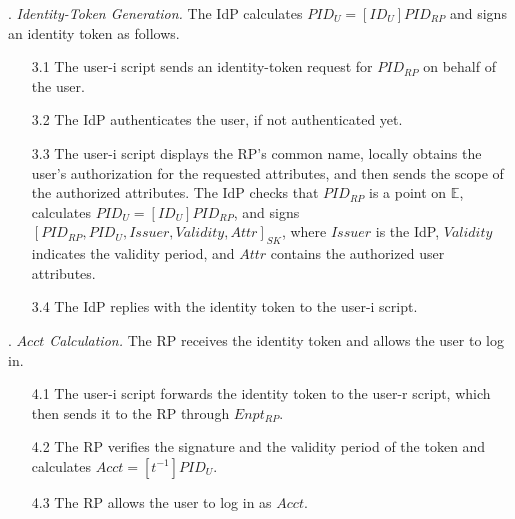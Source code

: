 . {\em Identity-Token Generation.}
The IdP calculates $PID_U = [ID_U]{PID_{RP}}$ and signs an identity token as follows. %
\vspace{-\topsep}
\begin{itemize}
\setlength{\topsep}{0pt}
\setlength{\partopsep}{0pt}
\setlength{\itemsep}{0pt}
\setlength{\parsep}{0pt}
\setlength{\parskip}{0pt}
\item[3.1]
The user-i script sends an identity-token request for $PID_{RP}$ on behalf of the user. %

\item[3.2] The IdP authenticates the user, if not authenticated yet.

\item [3.3]
The user-i script displays the RP's common name,
 locally obtains the user's authorization for the requested attributes,
 and then sends the scope of the authorized attributes.
The IdP checks that $PID_{RP}$ is a point on $\mathbb{E}$,
calculates $PID_U = [ID_U]{PID_{RP}}$, and signs $[PID_{RP}, PID_U, Issuer, Validity, Attr]_{SK}$, where $Issuer$ is the IdP, $Validity$ indicates the validity period, and $Attr$ contains the authorized user attributes.
\item[3.4] The IdP replies with the identity token to the user-i script.
\end{itemize}

. {\em $Acct$ Calculation.}
The RP receives the identity token and allows the user to log in.
\vspace{-\topsep}
\begin{itemize}
\setlength{\topsep}{0pt}
\setlength{\partopsep}{0pt}
\setlength{\itemsep}{0pt}
\setlength{\parsep}{0pt}
\setlength{\parskip}{0pt}
\item [4.1]
The user-i script forwards the identity token to the user-r script,
    which then sends it to the RP through $Enpt_{RP}$.
\item[4.2] The RP verifies the signature and the validity period of the token 
and calculates $Acct = [t^{-1}]{PID_U}$.

\item [4.3] The RP allows the user to log in as $Acct$.

\end{itemize}


